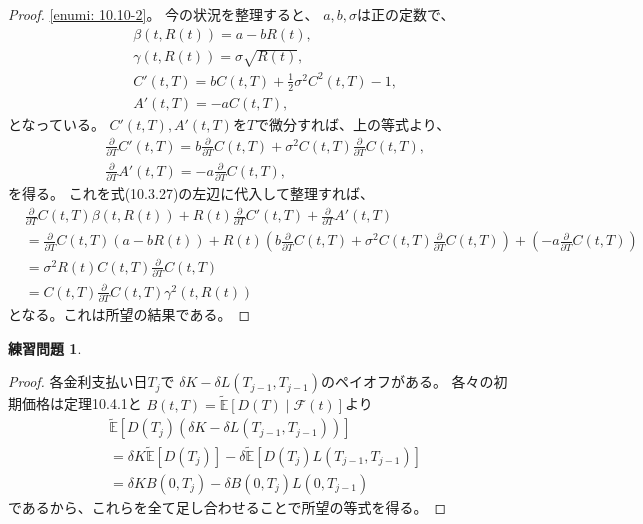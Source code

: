 \documentclass[uplatex]{jsarticle}
\theoremstyle{definition}
\newtheorem{prob}[prob]{練習問題}
\def\E{\mathbb{E}}
\def\mcF{\mathcal{F}}
\begin{document}
\begin{proof}
  \ref{enumi: 10.10-2}。
  今の状況を整理すると、
  \(a,b,\sigma\)は正の定数で、
  \begin{align*}
    &\beta(t,R(t)) = a - bR(t), \\
    &\gamma(t,R(t)) = \sigma\sqrt{R(t)}, \\
    &C'(t,T) = bC(t,T) + \frac{1}{2}\sigma^2C^2(t,T) - 1, \\
    &A'(t,T) = - aC(t,T),
  \end{align*}
  となっている。
  \(C'(t,T),A'(t,T)\)を\(T\)で微分すれば、上の等式より、
  \begin{align*}
    &\frac{\partial}{\partial T}C'(t,T)
    = b\frac{\partial}{\partial T}C(t,T)
    + \sigma^2C(t,T)\frac{\partial}{\partial T}C(t,T), \\
    &\frac{\partial}{\partial T}A'(t,T)
    = - a\frac{\partial}{\partial T}C(t,T),
  \end{align*}
  を得る。
  これを式(10.3.27)の左辺に代入して整理すれば、
  \begin{align*}
    &\frac{\partial}{\partial T}C(t,T)\beta(t,R(t))
    + R(t)\frac{\partial}{\partial T}C'(t,T)
    + \frac{\partial}{\partial T}A'(t,T) \\
    &= \frac{\partial}{\partial T}C(t,T)\left( a-bR(t) \right)
    + R(t)\left( b\frac{\partial}{\partial T}C(t,T)
    + \sigma^2C(t,T)\frac{\partial}{\partial T}C(t,T) \right)
    + \left( - a\frac{\partial}{\partial T}C(t,T)\right) \\
    &= \sigma^2R(t)C(t,T)\frac{\partial}{\partial T}C(t,T) \\
    &= C(t,T)\frac{\partial}{\partial T}C(t,T)\gamma^2(t,R(t))
  \end{align*}
  となる。これは所望の結果である。
\end{proof}



\begin{prob}\label{prob: 10.11}
\end{prob}

\begin{proof}
  各金利支払い日\(T_j\)で
  \(\delta K - \delta L(T_{j-1},T_{j-1})\)のペイオフがある。
  各々の初期価格は定理10.4.1と
  \(B(t,T) = \tilde{\E}\left[ D(T)\middle| \mcF(t)\right]\)より
  \begin{align*}
    &\tilde{\E}\left[ D(T_j)
    \left( \delta K - \delta L(T_{j-1},T_{j-1})\right)\right] \\
    &= \delta K\tilde{\E}\left[D(T_j)\right]
    - \delta \tilde{\E}\left[ D(T_j)L(T_{j-1},T_{j-1})\right] \\
    &= \delta KB(0,T_j) - \delta B(0,T_j)L(0,T_{j-1})
  \end{align*}
  であるから、これらを全て足し合わせることで所望の等式を得る。
\end{proof}
\end{document}
